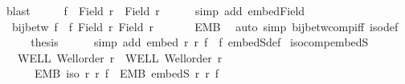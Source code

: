 \begin{isabellebody}
\ blast\isanewline
\ \ \isamarkupfalse%
\ \isamarkupfalse%
\ {\isachardoublequoteopen}f\ {\isacharbackquote}{\kern0pt}\ Field\ r\ {\isasymsubseteq}\ Field\ r{\isacharprime}{\kern0pt}{\isachardoublequoteclose}\isanewline
\ \ \ \ \isamarkupfalse%
\ {\isacharparenleft}{\kern0pt}simp\ add{\isacharcolon}{\kern0pt}\ embed{\isacharunderscore}{\kern0pt}Field\ {\isasymsection}{\isacharparenright}{\kern0pt}\isanewline
\ \ \isamarkupfalse%
\ \isamarkupfalse%
\ {\isachardoublequoteopen}{\isasymnot}\ bij{\isacharunderscore}{\kern0pt}betw\ {\isacharparenleft}{\kern0pt}f{\isacharprime}{\kern0pt}\ {\isasymcirc}\ f{\isacharparenright}{\kern0pt}\ {\isacharparenleft}{\kern0pt}Field\ r{\isacharparenright}{\kern0pt}\ {\isacharparenleft}{\kern0pt}Field\ r{\isacharprime}{\kern0pt}{\isacharprime}{\kern0pt}{\isacharparenright}{\kern0pt}{\isachardoublequoteclose}\isanewline
\ \ \ \ \isamarkupfalse%
\ {\isachardoublequoteopen}{\isasymsection}{\isachardoublequoteclose}\ EMB{\isacharprime}{\kern0pt}\ \isamarkupfalse%
\ {\isacharparenleft}{\kern0pt}auto\ simp{\isacharcolon}{\kern0pt}\ bij{\isacharunderscore}{\kern0pt}betw{\isacharunderscore}{\kern0pt}comp{\isacharunderscore}{\kern0pt}iff{}\ iso{\isacharunderscore}{\kern0pt}def{\isacharparenright}{\kern0pt}\isanewline
\ \ \isamarkupfalse%
\ \isamarkupfalse%
\ {\isacharquery}{\kern0pt}thesis\isanewline
\ \ \ \ \isamarkupfalse%
\ {\isacharparenleft}{\kern0pt}simp\ add{\isacharcolon}{\kern0pt}\ {\isacartoucheopen}embed\ r\ r{\isacharprime}{\kern0pt}{\isacharprime}{\kern0pt}\ {\isacharparenleft}{\kern0pt}f{\isacharprime}{\kern0pt}\ {\isasymcirc}\ f{\isacharparenright}{\kern0pt}{\isacartoucheclose}\ embedS{\isacharunderscore}{\kern0pt}def{\isacharparenright}{\kern0pt}\isanewline
{}\isamarkupfalse%
%
\endisatagproof
{\isafoldproof}%
%
\isadelimproof
\isanewline
%
\endisadelimproof
\isanewline
{}\isamarkupfalse%
\ iso{\isacharunderscore}{\kern0pt}comp{\isacharunderscore}{\kern0pt}embedS{\isacharcolon}{\kern0pt}\isanewline
\ \ \ WELL{\isacharcolon}{\kern0pt}\ {\isachardoublequoteopen}Well{\isacharunderscore}{\kern0pt}order\ r{\isachardoublequoteclose}\ \ WELL{\isacharprime}{\kern0pt}{\isacharcolon}{\kern0pt}\ {\isachardoublequoteopen}Well{\isacharunderscore}{\kern0pt}order\ r{\isacharprime}{\kern0pt}{\isachardoublequoteclose}\isanewline
\ \ \ \ \ \ EMB{\isacharcolon}{\kern0pt}\ {\isachardoublequoteopen}iso\ r\ r{\isacharprime}{\kern0pt}\ f{\isachardoublequoteclose}\ \ EMB{\isacharprime}{\kern0pt}{\isacharcolon}{\kern0pt}\ {\isachardoublequoteopen}embedS\ r{\isacharprime}{\kern0pt}\ r{\isacharprime}{\kern0pt}{\isacharprime}{\kern0pt}\ f{\isacharprime}{\kern0pt}{\isachardoublequoteclose}\isanewline

\end{isabellebody}
